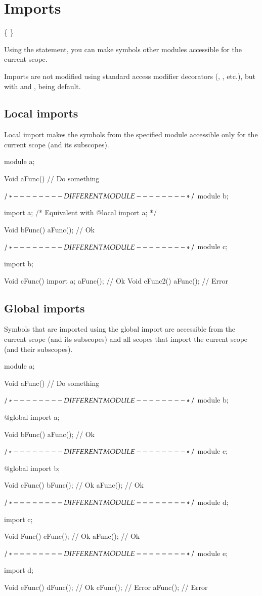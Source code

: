 \section{Imports} \label{imports}
\begin{grammar}
	 \{  \}   \kwd{;}
\end{grammar}

Using the  statement, you can make symbols other modules accessible for the current scope.

Imports are not modified using standard access modifier decorators (, , etc.), but with  and ,  being default.

\subsection{Local imports} \label{decorator:local}
Local import makes the symbols from the specified module accessible only for the current scope (and its subscopes).

\begin{code}
module a;

Void aFunc() {
	// Do something
}

$/* - - - - - - - - DIFFERENT MODULE - - - - - - - - */$
module b;

import a; /* Equivalent with @local import a; */

Void bFunc() {
	aFunc(); // Ok
}

$/* - - - - - - - - DIFFERENT MODULE - - - - - - - - */$
module c;

import b;

Void cFunc() {
	import a;
	aFunc(); // Ok
}
Void cFunc2() {
	aFunc(); // Error	
}
\end{code}

\subsection{Global imports} \label{decorator:global}
Symbols that are imported using the global import are accessible from the current scope (and its subscopes) and all scopes that import the current scope (and their subscopes).

\begin{code}
module a;

Void aFunc() {
	// Do something
}

$/* - - - - - - - - DIFFERENT MODULE - - - - - - - - */$
module b;

@global import a;

Void bFunc() {
	aFunc(); // Ok
}

$/* - - - - - - - - DIFFERENT MODULE - - - - - - - - */$
module c;

@global import b;

Void cFunc() {
	bFunc(); // Ok
	aFunc(); // Ok	
}

$/* - - - - - - - - DIFFERENT MODULE - - - - - - - - */$
module d;

import c;

Void Func() {
	cFunc(); // Ok
	aFunc(); // Ok
}

$/* - - - - - - - - DIFFERENT MODULE - - - - - - - - */$
module e;

import d;

Void eFunc() {
	dFunc(); // Ok
	cFunc(); // Error
	aFunc(); // Error	
}
\end{code}

